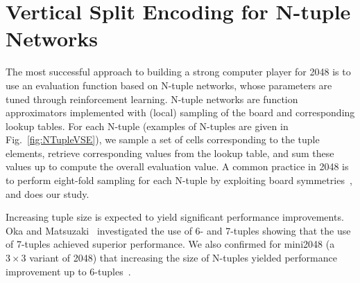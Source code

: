 \section{Vertical Split Encoding for N-tuple Networks}

The most successful approach to building a strong computer player for 2048 is to use an evaluation function based on N-tuple networks, whose parameters are tuned through reinforcement learning.
N-tuple networks are function approximators implemented with (local) sampling of the board and corresponding lookup tables.
For each N-tuple (examples of N-tuples are given in Fig.~\ref{fig:NTupleVSE}), we sample a set of cells corresponding to the tuple elements, retrieve corresponding values from the lookup table, and sum these values up to compute the overall evaluation value.
A common practice in 2048 is to perform eight-fold sampling for each N-tuple by exploiting board symmetries~\cite{SzJa14}, and does our study.

Increasing tuple size is expected to yield significant performance improvements.
Oka and Matsuzaki~\cite{OkMa16} investigated the use of 6- and 7-tuples showing that the use of 7-tuples achieved superior performance. We also confirmed for mini2048 (a $3\times 3$ variant of 2048) that increasing the size of N-tuples yielded performance improvement up to 6-tuples~\cite{TeMa25}.


